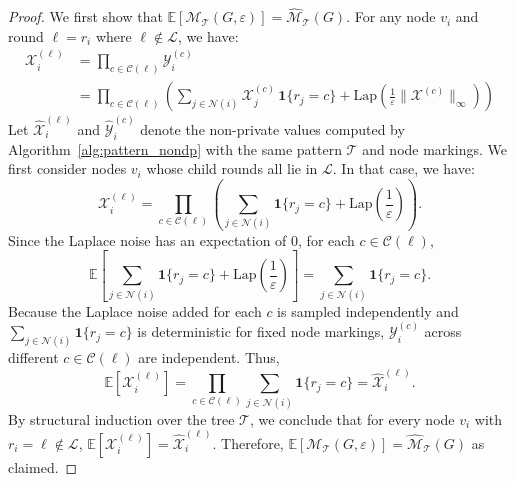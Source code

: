 \begin{proof}

We first show that $
    \mathbb{E}[\mathcal{M}_{\mathcal{T}}(G, \varepsilon)] = 
    \widehat{\mathcal{M}}_{\mathcal{T}}(G)
$. 
For any node $v_i$ and round $\ell = r_i$ where $\ell \notin \mathcal{L}$, we have:
\begin{align}
    \mathcal{X}^{(\ell)}_i 
&= \prod_{c \in \mathcal{C}(\ell)}  \mathcal{Y}^{(c)}_i \nonumber \\
&=
\label{e:x_pattern_update_rule}
\prod_{c \in \mathcal{C}(\ell)} 
\left(
\sum_{j \in \mathcal{N}(i)} 
           {\mathcal{X}}_j^{(c)} \,
           \mathbf{1}\{r_j = c\}
+ 
\mathrm{Lap}(\frac{1}{\varepsilon}\|\mathcal{X}^{(c)}\|_\infty )
\right)
\end{align}
Let $\widehat{\mathcal{X}}^{(\ell)}_i$ and $\widehat{\mathcal{Y}}^{(c)}_i$ denote the non-private values computed by Algorithm~\ref{alg:pattern_nondp} with the same pattern $\mathcal{T}$ and node markings.
We first consider nodes $v_i$ whose child rounds all lie in $\mathcal{L}$.
In that case, we have:
\begin{equation*}
    \mathcal{X}^{(\ell)}_i 
= \prod_{c \in \mathcal{C}(\ell)} 
\left(
\sum_{j \in \mathcal{N}(i)} 
           \mathbf{1}\{r_j = c\}
+ 
\mathrm{Lap}(\frac{1}{\varepsilon})
\right).
\end{equation*}
Since the Laplace noise has an expectation of $0$, for each $c \in \mathcal{C}(\ell)$, 
\begin{equation*}
    \mathbb{E}[\sum_{j \in \mathcal{N}(i)} 
           \mathbf{1}\{r_j = c\}
+ 
\mathrm{Lap}(\frac{1}{\varepsilon})] = \sum_{j \in \mathcal{N}(i)} 
           \mathbf{1}\{r_j = c\}. 
\end{equation*}
Because the Laplace noise added for each $c$ is sampled independently and $\sum_{j \in \mathcal{N}(i)} 
           \mathbf{1}\{r_j = c\}$ is deterministic for fixed node markings, $\mathcal{Y}^{(c)}_i$ across different $c \in \mathcal{C}(\ell)$ are independent. 
Thus,
\begin{equation*}
    \mathbb{E}[\mathcal{X}^{(\ell)}_i] = 
    \prod_{c \in \mathcal{C}(\ell)} 
    \sum_{j \in \mathcal{N}(i)} 
           \mathbf{1}\{r_j = c\} = \widehat{\mathcal{X}}_i^{(\ell)}.
\end{equation*}
By structural induction over the tree $\mathcal{T}$, we conclude that for every node $v_i$ with $r_i = \ell \notin \mathcal{L}$, $\mathbb{E}[\mathcal{X}^{(\ell)}_i] = \widehat{\mathcal{X}}^{(\ell)}_i$.
Therefore, $\mathbb{E}[\mathcal{M}_{\mathcal{T}}(G, \varepsilon)] = 
\widehat{\mathcal{M}}_{\mathcal{T}}(G)$ as claimed.



\end{proof}
